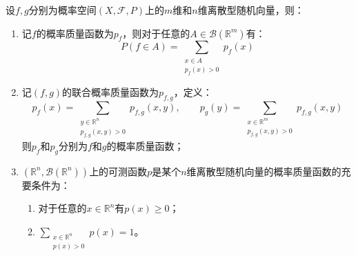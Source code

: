 \begin{property}\label{prop:DiscreteRV}
	设$f,g$分别为概率空间$(X,\mathscr{F},P)$上的$m$维和$n$维离散型随机向量，则：
	\begin{enumerate}
		\item 记$f$的概率质量函数为$p_f$，则对于任意的$A\in\mathcal{B}(\mathbb{R}^m)$有：
		\begin{equation*}
			P(f\in A)=\sum_{\substack{x\in A\\p_f(x)>0}}p_f(x)
		\end{equation*}
		\item 记$(f,g)$的联合概率质量函数为$p_{f,g}$，定义：
		\begin{equation*}
			p_f(x)=\sum_{\substack{y\in\mathbb{R}^n\\p_{f,g}(x,y)>0}}p_{f,g}(x,y),\qquad
			p_g(y)=\sum_{\substack{x\in\mathbb{R}^m\\p_{f,g}(x,y)>0}}p_{f,g}(x,y)
		\end{equation*}
		则$p_f$和$p_g$分别为$f$和$g$的概率质量函数；
		\item $(\mathbb{R}^{n},\mathcal{B}(\mathbb{R}^{n}))$上的可测函数$p$是某个$n$维离散型随机向量的概率质量函数的充要条件为：
		\begin{enumerate}
			\item 对于任意的$x\in\mathbb{R}^n$有$p(x)\geqslant0$；
			\item $\sum\limits_{\substack{x\in\mathbb{R}^n\\p(x)>0}}p(x)=1$。
		\end{enumerate}
	\end{enumerate}
\end{property}
